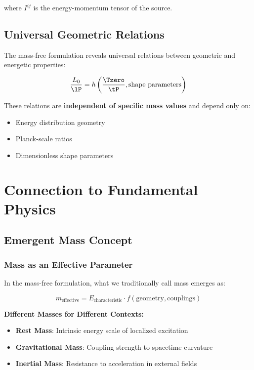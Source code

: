 	where $I^{ij}$ is the energy-momentum tensor of the source.
	
	\subsection{Universal Geometric Relations}
	\label{subsec:geometric_relations}
	
	The mass-free formulation reveals universal relations between geometric and energetic properties:
	
	\begin{equation}
		\frac{L_0}{\lP} = h\left(\frac{\Tzero}{\tP}, \text{shape parameters}\right)
		\label{eq:geometric_relation}
	\end{equation}
	
	These relations are \textbf{independent of specific mass values} and depend only on:
	\begin{itemize}
		\item Energy distribution geometry
		\item Planck-scale ratios
		\item Dimensionless shape parameters
	\end{itemize}
	
	\section{Connection to Fundamental Physics}
	\label{sec:fundamental_connection}
	
	\subsection{Emergent Mass Concept}
	\label{subsec:emergent_mass}
	
	\subsubsection{Mass as an Effective Parameter}
	
	In the mass-free formulation, what we traditionally call mass emerges as:
	
	\begin{equation}
		m_{\text{effective}} = E_{\text{characteristic}} \cdot f(\text{geometry}, \text{couplings})
		\label{eq:emergent_mass}
	\end{equation}
	
	\textbf{Different Masses for Different Contexts:}
	\begin{itemize}
		\item \textbf{Rest Mass}: Intrinsic energy scale of localized excitation
		\item \textbf{Gravitational Mass}: Coupling strength to spacetime curvature  
		\item \textbf{Inertial Mass}: Resistance to acceleration in external fields
	\end{itemize}
	
